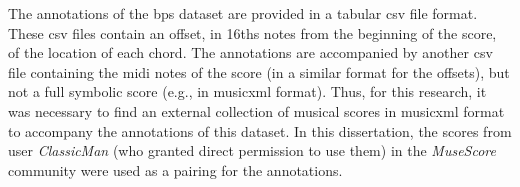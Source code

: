 

The annotations of the \gls{bps} dataset are provided in a
tabular \gls{csv} file format. These \gls{csv} files contain
an offset, in \glspl{16th} notes from the beginning of the
score, of the location of each chord. The annotations are
accompanied by another \gls{csv} file containing the
\gls{midi} notes of the score (in a similar format for the
offsets), but not a full symbolic score (e.g., in
\gls{musicxml} format). Thus, for this research, it was
necessary to find an external collection of musical scores
in \gls{musicxml} format to accompany the annotations of
this dataset. In this dissertation, the scores from user
\emph{ClassicMan} (who granted direct permission to use
them) in the \emph{MuseScore} community were used as a
pairing for the
annotations.
